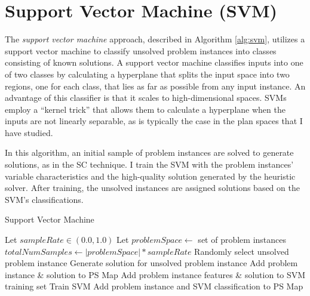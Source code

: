 \section{Support Vector Machine (SVM)}
The \textit{support vector machine} approach, described in Algorithm \ref{alg:svm}, utilizes a support vector machine \citep{vapnik95svm} to classify unsolved problem instances into classes consisting of known solutions.  A support vector machine classifies inputs into one of two classes by calculating a hyperplane that splits the input space into two regions, one for each class, that  lies as far as possible from any input instance.  An advantage of this classifier is that it scales to high-dimensional spaces.  SVMs employ a ``kernel trick'' that allows them to calculate a hyperplane when the inputs are not linearly separable, as is typically the case  in the plan spaces that I have studied.

In this algorithm, an initial sample of problem instances are solved to generate solutions, as in the SC technique.  I train the SVM with the problem instances' variable characteristics and the high-quality solution generated by the heuristic solver.    After training, the unsolved instances are assigned solutions based on  the SVM's classifications.


\begin{algorithm}
\caption{Support Vector Machine}   
\label{alg:svm}
\small
\begin{algorithmic}[1] %
  
  \State Let $sampleRate \in (0.0,1.0)$
  \State Let $problemSpace \leftarrow$ set of problem instances
  \State $totalNumSamples \leftarrow |problemSpace| * sampleRate$
    \State Randomly select unsolved problem instance
    \State Generate solution for unsolved problem instance
    \State Add problem instance \& solution to PS Map
    \State Add problem instance features \& solution to SVM training set
  \EndFor
  \State Train SVM
    \State Add problem instance and SVM classification to PS Map
  \EndFor
\end{algorithmic}
\end{algorithm}


